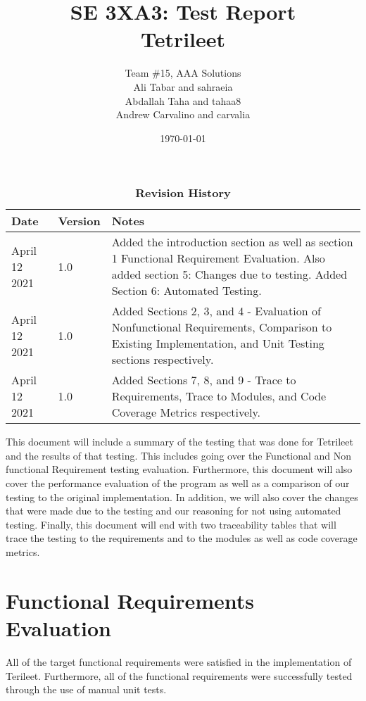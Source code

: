 \documentclass[12pt, titlepage]{article}
\title{SE 3XA3: Test Report\\Tetrileet}
\author{Team \#15, AAA Solutions
		\\ Ali Tabar and sahraeia
		\\ Abdallah Taha and tahaa8
		\\ Andrew Carvalino and carvalia
}
\date{\today}
\begin{document}
\maketitle

\tableofcontents
\listoftables
\listoffigures

\begin{table}[h!]
\caption{\bf Revision History}
\begin{tabularx}{\textwidth}{p{3cm}p{2cm}X}
\toprule {\bf Date} & {\bf Version} & {\bf Notes}\\
\midrule
April 12 2021 & 1.0 & Added the introduction section as well as section 1 Functional Requirement Evaluation. Also added section 5: Changes due to testing. Added Section 6: Automated Testing.\\
April 12 2021 & 1.0 & Added Sections 2, 3, and 4 - Evaluation of Nonfunctional Requirements, Comparison to Existing Implementation, and Unit Testing sections respectively.\\
April 12 2021 & 1.0 & Added Sections 7, 8, and 9 - Trace to Requirements, Trace to Modules, and Code Coverage Metrics respectively.\\
\bottomrule
\end{tabularx}
\end{table}

\newpage

This document will include a summary of the testing that was done for Tetrileet and the results of that testing. This includes going over the Functional and Non functional Requirement testing evaluation. Furthermore, this document will also cover the performance evaluation of the program as well as a comparison of our testing to the original implementation. In addition, we will also cover the changes that were made due to the testing and our reasoning for not using automated testing. Finally, this document will end with two traceability tables that will trace the testing to the requirements and to the modules as well as code coverage metrics. 
\newpage
\section{Functional Requirements Evaluation}
All of the target functional requirements were satisfied in the implementation of Terileet. Furthermore, all of the functional requirements were successfully tested through the use of manual unit tests.
\end{document}
